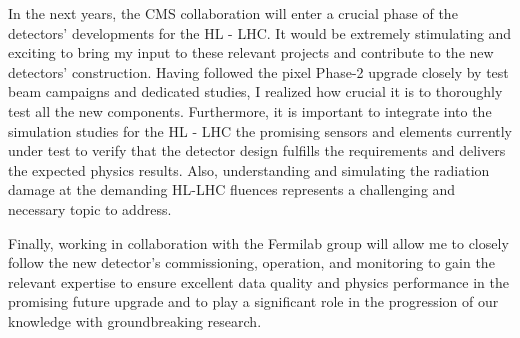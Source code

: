 {\begin{flushleft}
\vspace{\baselineskip}
In the next years, the CMS collaboration will enter a crucial phase of the detectors' developments for the HL - LHC.  It would be extremely stimulating and exciting to bring my input to these relevant projects and contribute to the new detectors' construction. Having followed the pixel Phase-2 upgrade closely by test beam campaigns and dedicated studies, I realized how crucial it is to thoroughly test all the new components. Furthermore, it is important to integrate into the simulation studies for the HL - LHC the promising sensors and elements currently under test to verify that the detector design fulfills the requirements and delivers the expected physics results. Also, understanding and simulating the radiation damage at the demanding HL-LHC fluences represents a challenging and necessary topic to address. 

\vspace{\baselineskip}
Finally, working in collaboration with the Fermilab group will allow me to closely follow the new detector's commissioning, operation, and monitoring to gain the relevant expertise to ensure excellent data quality and physics performance in the promising future upgrade and to play a significant role in the progression of our knowledge with groundbreaking research.
\vspace{\baselineskip}


\end{flushleft}
}
